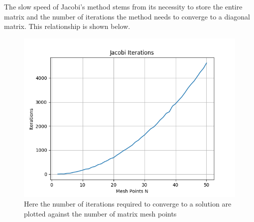 \documentclass{emulateapj}
\begin{document}
The slow speed of Jacobi's method stems from its necessity to store the entire matrix and the number of iterations the method needs to converge to a diagonal matrix. This relationship is shown below.
\begin{figure}[H]
    \centering
    \includegraphics[scale=0.5]{jacobi_iterations.png}
    \caption{Here the number of iterations required to converge to a solution are plotted against the number of matrix mesh points}
    \label{fig:2}
\end{figure}
\end{document}
